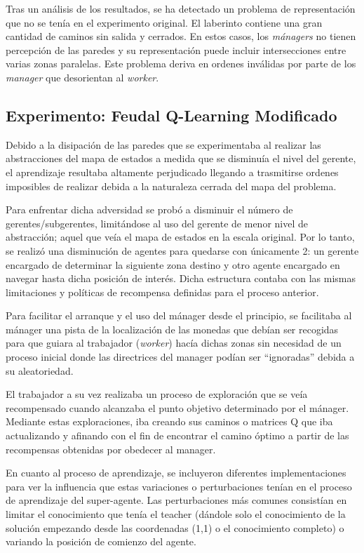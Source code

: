 \documentclass[letterpaper]{article} %
\begin{document}
Tras un análisis de los resultados, se ha detectado un problema de representación que no se tenía en el experimento original. El laberinto contiene 
una gran cantidad de caminos sin salida y cerrados. En estos casos, los \textit{mánagers} no tienen percepción de las paredes y su representación puede incluir
intersecciones entre varias zonas paralelas. Este problema deriva en ordenes inválidas por parte de los \textit{manager} que desorientan al \textit{worker}. 

\subsection{Experimento: Feudal Q-Learning Modificado}

Debido a la disipación de las paredes que se experimentaba al realizar las abstracciones del mapa de estados a medida que se disminuía
el nivel del gerente, el aprendizaje resultaba altamente perjudicado llegando a trasmitirse ordenes imposibles de realizar debida a la
naturaleza cerrada del mapa del problema.

Para enfrentar dicha adversidad se probó a disminuir el número de gerentes/subgerentes, limitándose al uso del gerente de menor nivel
de abstracción; aquel que veía el mapa de estados en la escala original. Por lo tanto, se realizó una disminución de agentes para 
quedarse con únicamente 2: un gerente encargado de determinar la siguiente zona destino y otro agente encargado en navegar hasta 
dicha posición de interés. Dicha estructura contaba con las mismas limitaciones y políticas de recompensa definidas para el proceso anterior.

Para facilitar el arranque y el uso del mánager desde el principio, se facilitaba al mánager una pista de la localización de las monedas que 
debían ser recogidas para que guiara al trabajador (\textit{worker}) hacía dichas zonas sin necesidad de un proceso inicial donde las directrices del
manager podían ser “ignoradas” debida a su aleatoriedad. 

El trabajador a su vez realizaba un proceso de exploración que se veía recompensado cuando alcanzaba el punto objetivo determinado por el mánager.
Mediante estas exploraciones, iba creando sus caminos o matrices Q que iba actualizando y afinando con el fin de encontrar el camino óptimo a
partir de las recompensas obtenidas por obedecer al manager.

En cuanto al proceso de aprendizaje, se incluyeron diferentes implementaciones para ver la influencia que estas variaciones o perturbaciones
tenían en el proceso de aprendizaje del super-agente. Las perturbaciones más comunes consistían en limitar el conocimiento que tenía el 
teacher (dándole solo el conocimiento de la solución empezando desde las coordenadas (1,1) o el conocimiento completo) o variando la posición
de comienzo del agente.
\end{document}
